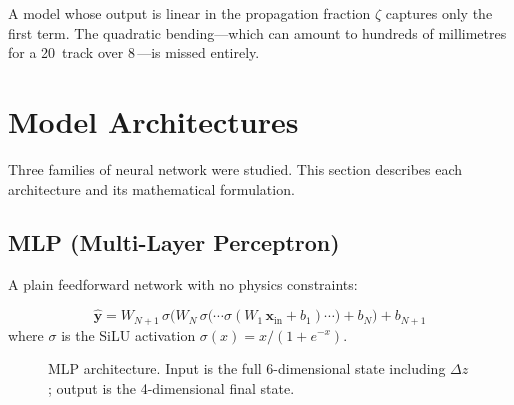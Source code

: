 \documentclass[11pt,a4paper]{article}
\newcommand{\SI}[2]{#1\,\text{#2}}
\newcommand{\zfrac}{\zeta}
\newcommand{\dz}{\Delta z}
\begin{document}
A model whose output is linear in the propagation fraction $\zfrac$ captures
only the first term.  The quadratic bending---which can amount to hundreds
of millimetres for a \SI{20}{GeV} track over \SI{8}{\metre}---is missed
entirely.

\section{Model Architectures}\label{sec:arch}

Three families of neural network were studied.  This section describes each
architecture and its mathematical formulation.

\subsection{MLP (Multi-Layer Perceptron)}\label{sec:mlp}

A plain feedforward network with no physics constraints:

\begin{equation}\label{eq:mlp}
  \hat{\mathbf{y}} = W_{N+1}\,\sigma\!\bigl(
    W_N\,\sigma\!\bigl(\cdots\sigma(W_1\,\mathbf{x}_{\mathrm{in}} + b_1)
    \cdots\bigr) + b_N\bigr) + b_{N+1}
\end{equation}
where $\sigma$ is the SiLU activation $\sigma(x)=x/(1+e^{-x})$.

\begin{figure}[H]
\centering
{}
\caption{MLP architecture.  Input is the full 6-dimensional state
  including $\dz$; output is the 4-dimensional final state.}
\label{fig:mlp_arch}
\end{figure}
\end{document}
